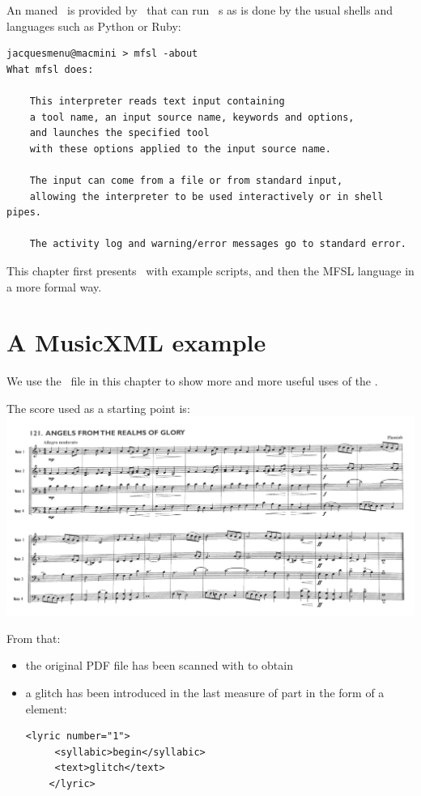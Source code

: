 An  maned \mfslExec\ is provided by \mf\, that can run \mfslLang\ \script s as is done by the usual shells and languages such as Python or Ruby:
\begin{lstlisting}[language=Terminal]
jacquesmenu@macmini > mfsl -about
What mfsl does:

    This interpreter reads text input containing
    a tool name, an input source name, keywords and options,
    and launches the specified tool
    with these options applied to the input source name.

    The input can come from a file or from standard input,
    allowing the interpreter to be used interactively or in shell pipes.

    The activity log and warning/error messages go to standard error.
\end{lstlisting}

This chapter first presents \mfslLang\ with example scripts, and then the MFSL language in a more formal way.


\section{A MusicXML example}

We use the  \mxml\ file in this chapter to show more and more useful uses of the \mfslLangInterp.

The score used as a starting point is:\\
\includegraphics[scale=0.5]{../graphics/Hymn121_OrigianlScore.png}

From that:
\begin{itemize}
\item the original PDF file has been scanned with  to obtain\\

\item a glitch has been introduced in the last measure of part  in the form of a  element:
\begin{lstlisting}[language=MusicXML]
    <lyric number="1">
     <syllabic>begin</syllabic>
     <text>glitch</text>
    </lyric>
\end{lstlisting}
\end{itemize}


